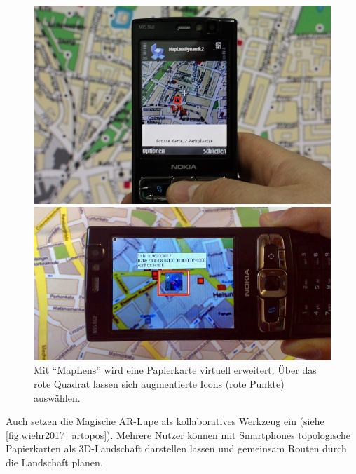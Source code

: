 \begin{figure}[h]
\begin{minipage}[t]{0.48\textwidth}
    \centering
    \includegraphics[width=\textwidth, height=0.25\textheight]{figures/rohs2009_ar_map.png}
    \caption{%
        Eine physische Karte wird mittels eines Kamerahandys um Preise für Parkplätze angereichert.
    }
    \label{fig:rohs2009_ar_map}
\end{minipage}%
\hfill
\begin{minipage}[t]{0.48\textwidth}
    \centering
    \includegraphics[width=\textwidth, height=0.25\textheight]{figures/morrison2009_ar_game.png}
    \caption{%
        Mit \enquote{MapLens} wird eine Papierkarte virtuell erweitert. %
        Über das rote Quadrat lassen sich augmentierte Icons (rote Punkte) auswählen. %
    }
    \label{fig:morrison2009_ar_game}
\end{minipage}
\end{figure}

Auch \textcite{Wiehr2017} setzen die Magische AR-Lupe als kollaboratives Werkzeug ein (siehe \autoref{fig:wiehr2017_artopos}).
Mehrere Nutzer können mit Smartphones topologische Papierkarten als 3D-Landschaft darstellen lassen und gemeinsam Routen durch die Landschaft planen.

